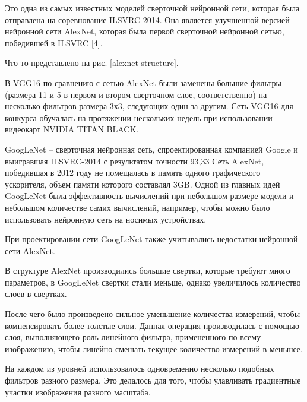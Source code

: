 Это одна из самых известных моделей сверточной нейронной сети, которая была отправлена на соревнование ILSVRC-2014. Она является улучшенной версией нейронной сети AlexNet, которая была первой сверточной нейронной сетью, победившей в ILSVRC [4].
 
Что-то представлено на рис. \ref{alexnet-structure}.

В VGG16 по сравнению с сетью AlexNet были заменены большие фильтры (размера 11 и 5 в первом и втором сверточном слое, соответственно) на несколько фильтров размера 3х3, следующих один за другим. Сеть VGG16 для конкурса обучалась на протяжении нескольких недель при использовании видеокарт NVIDIA TITAN BLACK. 


GoogLeNet – сверточная нейронная сеть, спроектированная компанией Google и выигравшая ILSVRC-2014 с результатом точности 93,33%
Сеть AlexNet, победившая в 2012 году не помещалась в память одного графического ускорителя, объем памяти которого составлял 3GB. 
Одной из главных идей GoogLeNet была эффективность вычислений при небольшом размере модели и небольшом количестве самих вычислений, например, чтобы можно было использовать нейронную сеть на носимых устройствах.



При проектировании сети GoogLeNet также учитывались недостатки нейронной сети AlexNet. 

В структуре AlexNet производились большие свертки, которые требуют много параметров, в GoogLeNet свертки стали меньше, однако увеличилось количество слоев в свертках.

После чего было произведено сильное уменьшение количества измерений, чтобы компенсировать более толстые слои. 
Данная операция производилась с помощью слоя, выполняющего роль линейного фильтра, примененного по всему изображению, чтобы линейно смешать текущее количество измерений в меньшее.

На каждом из уровней использовалось одновременно несколько подобных фильтров разного размера. 
Это делалось для того, чтобы улавливать градиентные участки изображения разного масштаба.

